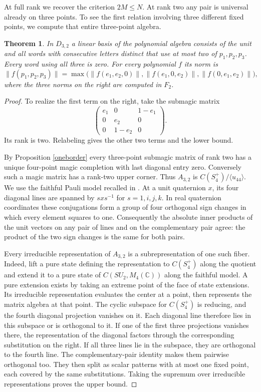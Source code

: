 \documentclass[11pt,a4paper]{article}
\newtheorem{thm}{Theorem}[section]
\begin{document}
At full rank we recover the criterion $2M\leq N$. At rank two any pair is universal already on three points. To see the first relation involving three different fixed points, we compute that entire three-point algebra.

\begin{thm}\label{ranktwothree}
In $D_{3,2}$ a linear basis of the polynomial algebra consists of the unit and all words with consecutive letters distinct that use at most two of $p_1,p_2,p_3$. Every word using all three is zero. For every polynomial $f$ its norm is
\[
 \|f(p_1,p_2,p_3)\|
 =\max\big(\|f(e_1,e_2,0)\|,\|f(e_1,0,e_2)\|,\|f(0,e_1,e_2)\|\big),
\]
where the three norms on the right are computed in $F_2$.
\end{thm}
\begin{proof}
To realize the first term on the right, take the submagic matrix
\[
 \begin{pmatrix}e_1&0&1-e_1\\0&e_2&0\\0&1-e_2&0\end{pmatrix}.
\]
Its rank is two. Relabeling gives the other two terms and the lower bound.

By Proposition \ref{oneborder} every three-point submagic matrix of rank two has a unique four-point magic completion with last diagonal entry zero. Conversely such a magic matrix has a rank-two upper corner. Thus $A_{3,2}$ is $C(S_4^+)/\langle u_{44}\rangle$. We use the faithful Pauli model recalled in \cite{qp}. At a unit quaternion $x$, its four diagonal lines are spanned by $s x s^{-1}$ for $s=1,i,j,k$. In real quaternion coordinates these conjugations form a group of four orthogonal sign changes in which every element squares to one. Consequently the absolute inner products of the unit vectors on any pair of lines and on the complementary pair agree: the product of the two sign changes is the same for both pairs.

Every irreducible representation of $A_{3,2}$ is a subrepresentation of one such fiber. Indeed, lift a pure state defining the representation to $C(S_4^+)$ along the quotient and extend it to a pure state of $C(SU_2,M_4(\mathbb C))$ along the faithful model. A pure extension exists by taking an extreme point of the face of state extensions. Its irreducible representation evaluates the center at a point, then represents the matrix algebra at that point. The cyclic subspace for $C(S_4^+)$ is reducing, and the fourth diagonal projection vanishes on it. Each diagonal line therefore lies in this subspace or is orthogonal to it. If one of the first three projections vanishes there, the representation of the diagonal factors through the corresponding substitution on the right. If all three lines lie in the subspace, they are orthogonal to the fourth line. The complementary-pair identity makes them pairwise orthogonal too. They then split as scalar patterns with at most one fixed point, each covered by the same substitutions. Taking the supremum over irreducible representations proves the upper bound.


\end{proof}
\end{document}
